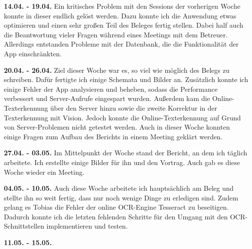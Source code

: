 \documentclass[notables, nomenclature, oneside, 150]{HSMW-Thesis}
\begin{document}
	\textbf{14.04. - 19.04.}
	Ein kritisches Problem mit den Sessions der vorherigen Woche konnte in dieser endlich gelöst werden. Dazu konnte ich die Anwendung etwas optimieren und einen sehr großen Teil des Beleges fertig stellen. Dabei half auch die Beantwortung vieler Fragen während eines Meetings mit dem Betreuer. Allerdings entstanden Probleme mit der Datenbank, die die Funktionalität der App einschränkten.
	
	\textbf{20.04. - 26.04.}
	Ziel dieser Woche war es, so viel wie möglich des Belegs zu schreiben. Dafür fertigte ich einige Schemata und Bilder an. Zusätzlich konnte ich einige Fehler der App analysieren und beheben, sodass die Performance verbessert und Server-Aufrufe eingespart wurden. Außerdem kam die Online-Texterkennung über den Server hinzu sowie die zweite Korrektur in der Texterkennung mit Vision. Jedoch konnte die Online-Texterkennung auf Grund von Server-Problemen nicht getestet werden. Auch in dieser Woche konnten einige Fragen zum Aufbau des Berichts in einem Meeting geklärt werden. 
	
	\textbf{27.04. - 03.05.}
	Im Mittelpunkt der Woche stand der Bericht, an dem ich täglich arbeitete. Ich erstellte einige Bilder für ihn und den Vortrag. Auch gab es diese Woche wieder ein Meeting.
	
	\textbf{04.05. - 10.05.}
	Auch diese Woche arbeitete ich hauptsächlich am Beleg und stellte ihn so weit fertig, dass nur noch wenige Dinge zu erledigen sind. Zudem gelang es Tobias die Fehler der online OCR-Engine Tesseract zu beseitigen. Dadurch konnte ich die letzten fehlenden Schritte für den Umgang mit den OCR-Schnittstellen implementieren und testen.
	
	\textbf{11.05. - 15.05.}




\end{document}
